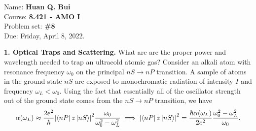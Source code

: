 \documentclass{article}
\theoremstyle{definition}
\newcommand{\al}{\alpha}
\newcommand{\f}[2]{\frac{#1}{#2}}
\begin{document}
\begin{framed}
\noindent Name: \textbf{Huan Q. Bui}\\
Course: \textbf{8.421 - AMO I}\\
Problem set: \textbf{\#8}\\
Due: Friday, April 8, 2022.
\end{framed}
	

\noindent \textbf{1. Optical Traps and Scattering.} What are are the proper power and wavelength needed to trap an ultracold atomic gas? Consider an alkali atom with resonance frequency $\omega_0$ on the principal $nS \to nP$ transition. A sample of atoms in the ground state $nS$ are exposed to monochromatic radiation of intensity $I$ and frequency $\omega_L < \omega_0$.  Using the fact that essentially all of the oscillator strength out of the ground state comes from the $nS \to nP$ transition, we have
\begin{align*}
\alpha(\omega_L) \approx \f{2e^2}{\hbar} \abs{\bra{nP} z \ket{nS}}^2 \f{\omega_0}{\omega_0^2 - \omega_L^2} \implies \abs{\bra{nP} z \ket{nS}}^2 = \f{\hbar \al(\omega_L)}{2e^2} \f{\omega_0^2 - \omega_L^2}{\omega_0}.
\end{align*} 
\end{document}
